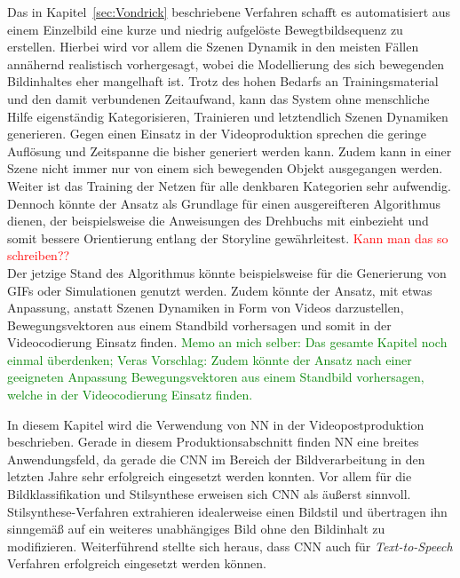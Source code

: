 \documentclass[times, 11pt,twocolumn]{article}
\begin{document}
 \label{sec:VondrickConclusion}
Das in Kapitel~\ref{sec:Vondrick} beschriebene Verfahren schafft es automatisiert aus einem Einzelbild eine kurze und niedrig aufgelöste Bewegtbildsequenz zu erstellen. Hierbei wird vor allem die Szenen Dynamik in den meisten Fällen annähernd realistisch vorhergesagt, wobei die Modellierung des sich bewegenden Bildinhaltes eher mangelhaft ist. Trotz des hohen Bedarfs an Trainingsmaterial und den damit verbundenen Zeitaufwand, kann das System ohne menschliche Hilfe eigenständig Kategorisieren, Trainieren und letztendlich Szenen Dynamiken generieren. Gegen einen Einsatz in der Videoproduktion sprechen die geringe Auflösung und Zeitspanne die bisher generiert werden kann. Zudem kann in einer Szene nicht immer nur von einem sich bewegenden Objekt ausgegangen werden. Weiter ist das Training der Netzen für alle denkbaren Kategorien sehr aufwendig. Dennoch könnte der Ansatz als Grundlage für einen ausgereifteren Algorithmus dienen, der beispielsweise die Anweisungen des Drehbuchs mit einbezieht und somit bessere Orientierung entlang der Storyline gewährleitest. \textcolor{red}{Kann man das so schreiben??}\\
Der jetzige Stand des Algorithmus könnte beispielsweise für die Generierung von GIFs oder Simulationen genutzt werden. Zudem könnte der Ansatz, mit etwas Anpassung, anstatt Szenen Dynamiken in Form von Videos darzustellen, Bewegungsvektoren aus einem Standbild vorhersagen und somit in der Videocodierung Einsatz finden. \textcolor{green}{Memo an mich selber: Das gesamte Kapitel noch einmal überdenken; Veras Vorschlag: Zudem könnte der Ansatz nach einer geeigneten Anpassung Bewegungsvektoren aus einem Standbild vorhersagen, welche in der Videocodierung Einsatz finden.}




 \label{sec:Postroduktion}

In diesem Kapitel wird die Verwendung von NN in der Videopostproduktion beschrieben. Gerade in diesem Produktionsabschnitt finden NN eine breites Anwendungsfeld, da gerade die CNN im Bereich der Bildverarbeitung in den letzten Jahre sehr erfolgreich eingesetzt werden konnten. Vor allem für die Bildklassifikation und Stilsynthese erweisen sich CNN als äußerst sinnvoll. Stilsynthese-Verfahren extrahieren idealerweise einen Bildstil und übertragen ihn sinngemäß auf ein weiteres unabhängiges Bild ohne den Bildinhalt zu modifizieren. Weiterführend stellte sich heraus, dass CNN auch für \textit{Text-to-Speech} Verfahren erfolgreich eingesetzt werden können.\\
\end{document}
